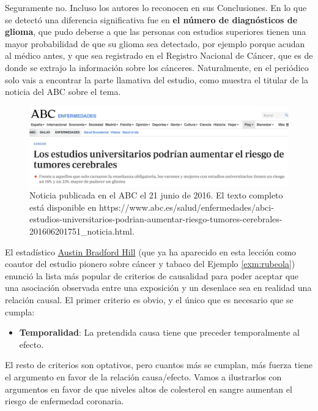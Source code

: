 \documentclass[
]{book}
\providecommand{\tightlist}{%
  \setlength{\itemsep}{0pt}\setlength{\parskip}{0pt}}
\theoremstyle{definition}
\theoremstyle{definition}
\theoremstyle{definition}
\theoremstyle{definition}
\theoremstyle{remark}
\begin{document}
Seguramente no. Incluso los autores lo reconocen en sus Conclusiones. En lo que se detectó una diferencia significativa fue en \textbf{el número de diagnósticos de glioma}, que pudo deberse a que las personas con estudios superiores tienen una mayor probabilidad de que su glioma sea detectado, por ejemplo porque acudan al médico antes, y que sea registrado en el Registro Nacional de Cáncer, que es de donde se extrajo la información sobre los cánceres. Naturalmente, en el periódico solo vais a encontrar la parte llamativa del estudio, como muestra el titular de la noticia del ABC sobre el tema.

\begin{figure}

{\centering \includegraphics[width=0.8\linewidth]{INREMDN_files/figure-html/ABCglioma} 

}

\caption{Noticia publicada en el ABC el 21 junio de 2016. El texto completo está disponible en https://www.abc.es/salud/enfermedades/abci-estudios-universitarios-podrian-aumentar-riesgo-tumores-cerebrales-201606201751_noticia.html.}\label{fig:ABCglioma}
\end{figure}

El estadístico \href{https://es.wikipedia.org/wiki/Austin_Bradford_Hill}{Austin Bradford Hill} (que ya ha aparecido en esta lección como coautor del estudio pionero sobre cáncer y tabaco del Ejemplo \ref{exm:rubeola}) enunció la lista más popular de criterios de causalidad para poder aceptar que una asociación observada entre una exposición y un desenlace sea en realidad una relación causal. El primer criterio es obvio, y el único que es necesario que se cumpla:

\begin{itemize}
\tightlist
\item
  \textbf{Temporalidad}: La pretendida causa tiene que preceder temporalmente al efecto.
\end{itemize}

El resto de criterios son optativos, pero cuantos más se cumplan, más fuerza tiene el argumento en favor de la relación causa/efecto. Vamos a ilustrarlos con argumentos en favor de que niveles altos de colesterol en sangre aumentan el riesgo de enfermedad coronaria.
\end{document}
